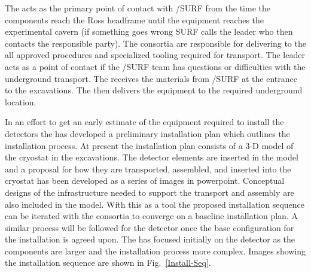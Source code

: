 The  acts as the primary point of contact with /SURF
from the time the components reach the Ross headframe until the
equipment reaches the experimental cavern (if something goes wrong
SURF calls the  leader who then contacts the responsible
party). The consortia are responsible for delivering to the  all
approved procedures and specialized tooling required for
transport. The  leader acts as a point of contact if the
/SURF team has questions or difficulties with the
underground transport.  The  receives the materials from
/SURF at the entrance to the  excavations. The
 then delivers the equipment to the required underground location.

In an effort to get an early estimate of the equipment required to
install the detectors the  has developed a preliminary installation
plan which outlines the installation process. At present the
installation plan consists of a 3-D model of the cryostat in the
excavations. The  detector elements are inserted in the
model and a proposal for how they are transported, assembled, and
inserted into the cryostat has been developed as a series of images in
powerpoint. Conceptual designs of the infrastructure needed to support
the transport and assembly are also included in the model. With this
as a tool the proposed installation sequence can be iterated with the
consortia to converge on a baseline installation plan. A similar
process will be followed for the  detector once the base
configuration for the  installation is agreed upon. The 
has focused initially on the  detector as the 
components are larger and the installation process more
complex. Images showing the  installation sequence are shown
in Fig.~\ref{Install-Seq}.
